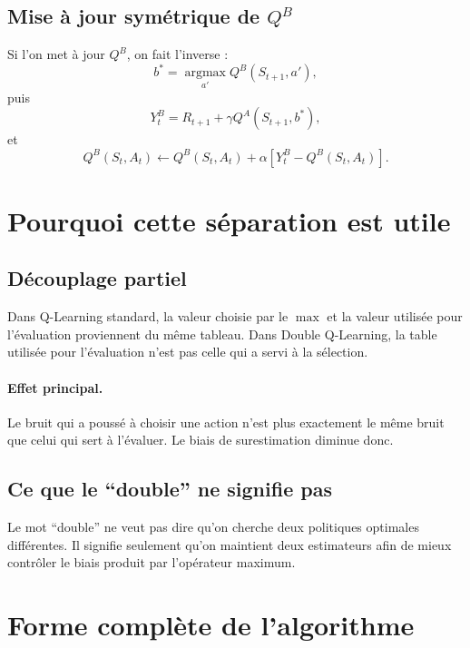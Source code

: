 \documentclass[11pt,a4paper]{article}
\newcommand{\argmax}{\operatorname*{argmax}}
\begin{document}
\subsection{Mise à jour symétrique de $Q^B$}

Si l'on met à jour $Q^B$, on fait l'inverse :
\[
b^*=\argmax_{a'} Q^B(S_{t+1},a'),
\]
puis
\[
Y_t^{B}=R_{t+1}+\gamma Q^A(S_{t+1},b^*),
\]
et
\[
Q^B(S_t,A_t)\leftarrow Q^B(S_t,A_t)+\alpha\left[Y_t^B-Q^B(S_t,A_t)\right].
\]

\section{Pourquoi cette séparation est utile}

\subsection{Découplage partiel}

Dans Q-Learning standard, la valeur choisie par le $\max$ et la valeur utilisée pour l'évaluation proviennent du même tableau. Dans Double Q-Learning, la table utilisée pour l'évaluation n'est pas celle qui a servi à la sélection.

\paragraph{Effet principal.}
Le bruit qui a poussé à choisir une action n'est plus exactement le même bruit que celui qui sert à l'évaluer. Le biais de surestimation diminue donc.

\subsection{Ce que le ``double'' ne signifie pas}

Le mot ``double'' ne veut pas dire qu'on cherche deux politiques optimales différentes. Il signifie seulement qu'on maintient deux estimateurs afin de mieux contrôler le biais produit par l'opérateur maximum.

\section{Forme complète de l'algorithme}
\end{document}

